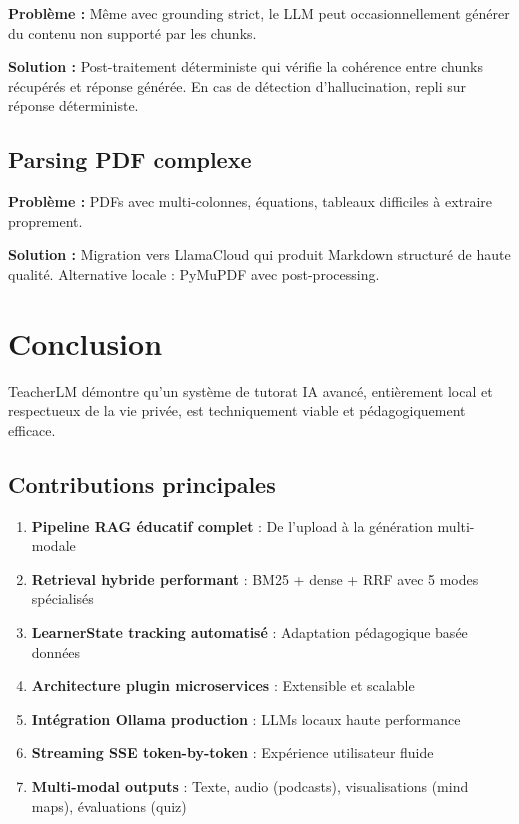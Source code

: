 \documentclass[12pt,a4paper]{article}
\begin{document}
\textbf{Problème :} Même avec grounding strict, le LLM peut occasionnellement générer du contenu non supporté par les chunks.

\textbf{Solution :} Post-traitement déterministe qui vérifie la cohérence entre chunks récupérés et réponse générée. En cas de détection d'hallucination, repli sur réponse déterministe.

\subsection{Parsing PDF complexe}

\textbf{Problème :} PDFs avec multi-colonnes, équations, tableaux difficiles à extraire proprement.

\textbf{Solution :} Migration vers LlamaCloud qui produit Markdown structuré de haute qualité. Alternative locale : PyMuPDF avec post-processing.

\section{Conclusion}

TeacherLM démontre qu'un système de tutorat IA avancé, entièrement local et respectueux de la vie privée, est techniquement viable et pédagogiquement efficace.

\subsection{Contributions principales}

\begin{enumerate}
    \item \textbf{Pipeline RAG éducatif complet} : De l'upload à la génération multi-modale
    \item \textbf{Retrieval hybride performant} : BM25 + dense + RRF avec 5 modes spécialisés
    \item \textbf{LearnerState tracking automatisé} : Adaptation pédagogique basée données
    \item \textbf{Architecture plugin microservices} : Extensible et scalable
    \item \textbf{Intégration Ollama production} : LLMs locaux haute performance
    \item \textbf{Streaming SSE token-by-token} : Expérience utilisateur fluide
    \item \textbf{Multi-modal outputs} : Texte, audio (podcasts), visualisations (mind maps), évaluations (quiz)
\end{enumerate}
\end{document}
